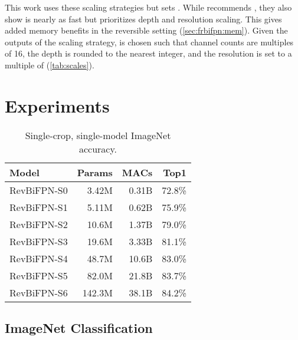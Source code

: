 \documentclass{article}
\begin{document}
This work uses these scaling strategies but sets .
While \citet{dollar2021fast} recommends , they also show  is nearly as fast but prioritizes depth and resolution scaling.
This gives added memory benefits in the reversible setting (\cref{sec:frbifpn:mem}).
Given the outputs of the scaling strategy,  is chosen such that channel counts are multiples of 16, the depth is rounded to the nearest integer, and the resolution is set to a multiple of  (\cref{tab:scales}).



\section{Experiments}
\label{sec:exp}



\begin{table}
    \caption{Single-crop, single-model ImageNet accuracy.}
    \vskip 10pt
    \centering
    \small
    \sc
    \begin{tabular}{lrrr}
        \toprule
        Model       &  Params &  MACs &   Top1 \\ \midrule
        RevBiFPN-S0 &   3.42M & 0.31B & 72.8\% \\
        RevBiFPN-S1 &   5.11M & 0.62B & 75.9\% \\
        RevBiFPN-S2 &   10.6M & 1.37B & 79.0\% \\
        RevBiFPN-S3 &   19.6M & 3.33B & 81.1\% \\
        RevBiFPN-S4 &   48.7M & 10.6B & 83.0\% \\
        RevBiFPN-S5 &   82.0M & 21.8B & 83.7\% \\
        RevBiFPN-S6 &  142.3M & 38.1B & 84.2\% \\
        \bottomrule
    \end{tabular}
    \vskip -7pt
    \label{tab:i1kacc}
\end{table}


\subsection{ImageNet Classification}
\label{sec:exp:cls}
\end{document}
